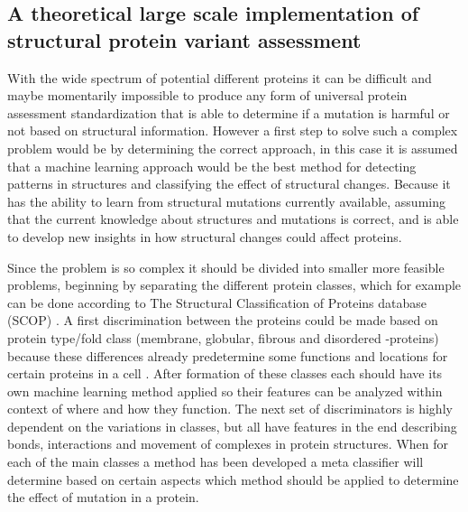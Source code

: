 \subsection{A theoretical large scale implementation of structural protein variant assessment}
With the wide spectrum of potential different proteins it can be difficult and maybe momentarily impossible to produce any form of universal protein assessment standardization that is able to determine if a mutation is harmful or not based on structural information. However a first step to solve such a complex problem would be by determining the correct approach, in this case it is assumed that a machine learning approach would be the best method for detecting patterns in structures and classifying the effect of structural changes. Because it has the ability to learn from structural mutations currently available, assuming that the current knowledge about structures and mutations is correct, and is able to develop new insights in how structural changes could affect proteins. 

Since the problem is so complex it should be divided into smaller more feasible problems, beginning by separating the different protein classes, which  for example can be done according to The Structural Classification of Proteins database (SCOP) \cite{andreeva_scop2_2014}. A first discrimination between the proteins could be made based on protein type/fold class (membrane, globular, fibrous and disordered -proteins) because these differences already predetermine some functions and locations for certain proteins in a cell \cite{wikipedia_membrane_2019, wikipedia_globular_2019,wikipedia_scleroprotein_2018,wikipedia_intrinsically_2019}. After formation of these classes each should have its own machine learning method applied so their features can be analyzed within context of where and how they function. The next set of discriminators is highly dependent on the variations in classes, but all have features in the end describing bonds, interactions and movement of complexes in protein structures. When for each of the main classes a method has been developed a meta classifier will determine based on certain aspects which method should be applied to determine the effect of mutation in a protein.
\label{subsec:GD_theoratical_large_scale_implementation}

